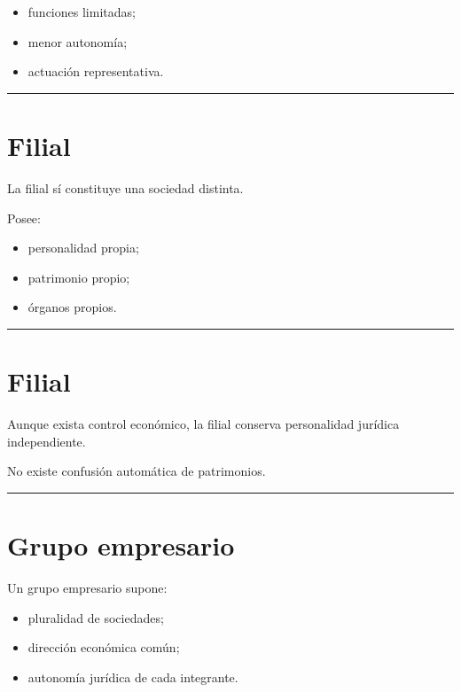 \documentclass[
  spanish,
  letterpaper,
  DIV=11,
  numbers=noendperiod]{scrartcl}
\providecommand{\tightlist}{%
  \setlength{\itemsep}{0pt}\setlength{\parskip}{0pt}}
\begin{document}
\begin{itemize}
\tightlist
\item
  funciones limitadas;
\item
  menor autonomía;
\item
  actuación representativa.
\end{itemize}

\begin{center}\rule{0.5\linewidth}{0.5pt}\end{center}

\section{Filial}\label{filial}

La filial sí constituye una sociedad distinta.

Posee:

\begin{itemize}
\tightlist
\item
  personalidad propia;
\item
  patrimonio propio;
\item
  órganos propios.
\end{itemize}

\begin{center}\rule{0.5\linewidth}{0.5pt}\end{center}

\section{Filial}\label{filial-1}

Aunque exista control económico, la filial conserva personalidad
jurídica independiente.

No existe confusión automática de patrimonios.

\begin{center}\rule{0.5\linewidth}{0.5pt}\end{center}

\section{Grupo empresario}\label{grupo-empresario}

Un grupo empresario supone:

\begin{itemize}
\tightlist
\item
  pluralidad de sociedades;
\item
  dirección económica común;
\item
  autonomía jurídica de cada integrante.
\end{itemize}
\end{document}
